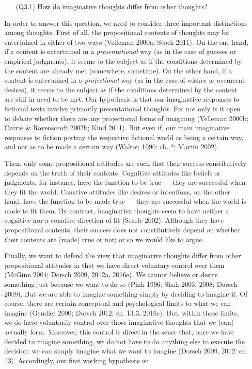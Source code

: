 \vspace{-.1cm}
\begin{itemize}[leftmargin=2cm]
\item[(Q3.1)] How do imaginative thoughts differ from other thoughts?
\end{itemize}
\vspace{-.1cm}

\noindent In order to answer this question, we need to consider three important distinctions among thoughts. First of all, the propositional contents of thoughts may be entertained in either of two ways (Velleman 2000a; Stock 2011). On the one hand, if a content is entertained in a \emph{presentational} way (as in the case of guesses or empirical judgments), it seems to the subject as if the conditions determined by the content are already met (somewhere, sometime). On the other hand, if a content is entertained in a \emph{projectional} way (as in the case of wishes or occurrent desires), it seems to the subject as if the conditions determined by the content are still in need to be met. Our hypothesis is that our imaginative responses to fictional texts involve primarily presentational thoughts. For not only is it open to debate whether there are any projectional forms of imagining (Velleman 2000b; Currie \& Ravenscroft 2002b; Kind 2011). But even if, our main imaginative responses to fiction portray the respective fictional world as being a certain way, and not as to be made a certain way (Walton 1990: ch. *; Martin 2002).

Then, only some propositional attitudes are such that their success constitutively depends on the truth of their contents. Cognitive attitudes like beliefs or judgments, for instance, have the function to be true --- they are successful when they fit the world. Conative attitudes like desires or intentions, on the other hand, have the function to be made true --- they are successful when the world is made to fit them. By contrast, imaginative thoughts seem to have neither a cognitive nor a conative direction of fit (Searle 2002). Although they have propositional contents, their success does not constitutively depend on whether their contents are (made) true or not; or so we would like to argue.

Finally, we want to defend the view that imaginative thoughts differ from other propositional attitudes in that we have direct voluntary control over them (McGinn 2004; Dorsch 2009, 2012a, 2016e). We cannot believe or desire something just because we want to do so (Pink 1996; Shah 2003, 2008; Dorsch 2009). But we are able to imagine something simply by deciding to imagine it. Of course, there are certain conceptual and psychological limits to what we can imagine (Gendler 2000; Dorsch 2012: ch. 13.3, 2016c). But, within these limits, we do have voluntarily control over those imaginative thoughts that we (can) actually form. Moreover, this control is direct in the sense that, once we have decided to imagine something, we do not have to do anything else to execute the decision: we can simply imagine what we want to imagine (Dorsch 2009, 2012: ch. 13). Accordingly, our first working hypothesis is:

